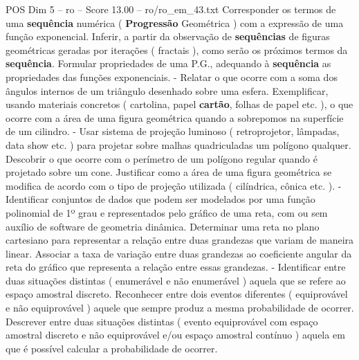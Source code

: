 \begin{textsample}{POS Dim 5 – ro – Score 13.00 – ro/ro\_em\_43.txt}
Corresponder os termos de uma \textbf{sequência} numérica ( \textbf{Progressão} Geométrica ) com a expressão de uma função exponencial.
Inferir, a partir da observação de \textbf{sequências} de figuras geométricas geradas por iterações ( fractais ), como serão os próximos termos da \textbf{sequência}.
Formular propriedades de uma P.G., adequando à \textbf{sequência} as propriedades das funções exponenciais. - Relatar o que ocorre com a soma dos ângulos internos de um triângulo desenhado sobre uma esfera.
Exemplificar, usando materiais concretos ( cartolina, papel \textbf{cartão}, folhas de papel etc. ), o que ocorre com a área de uma figura geométrica quando a sobrepomos na superfície de um cilindro. - Usar sistema de projeção luminoso ( retroprojetor, lâmpadas, data show etc. ) para projetar sobre malhas quadriculadas um polígono qualquer.
Descobrir o que ocorre com o perímetro de um polígono regular quando é projetado sobre um cone.
Justificar como a área de uma figura geométrica se modifica de acordo com o tipo de projeção utilizada ( cilíndrica, cônica etc. ). - Identificar conjuntos de dados que podem ser modelados por uma função polinomial de 1º grau e representados pelo gráfico de uma reta, com ou sem auxílio de software de geometria dinâmica.
Determinar uma reta no plano cartesiano para representar a relação entre duas grandezas que variam de maneira linear.
Associar a taxa de variação entre duas grandezas ao coeficiente angular da reta do gráfico que representa a relação entre essas grandezas. - Identificar entre duas situações distintas ( enumerável e não enumerável ) aquela que se refere ao espaço amostral discreto.
Reconhecer entre dois eventos diferentes ( equiprovável e não equiprovável ) aquele que sempre produz a mesma probabilidade de ocorrer.
Descrever entre duas situações distintas ( evento equiprovável com espaço amostral discreto e não equiprovável e/ou espaço amostral contínuo ) aquela em que é possível calcular a probabilidade de ocorrer.

\end{textsample}
